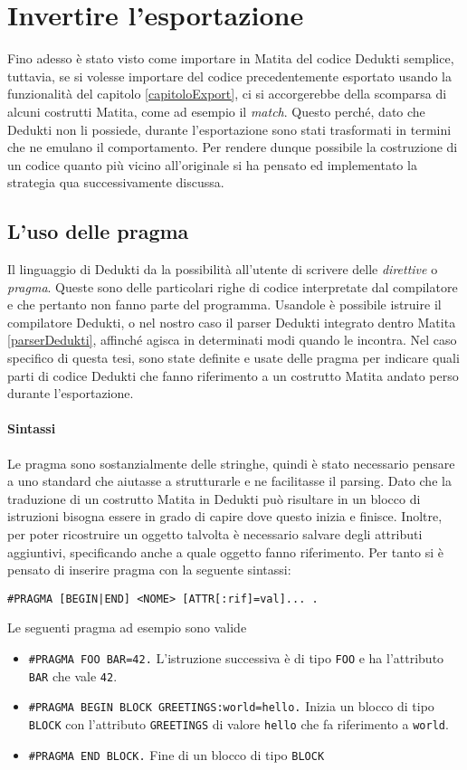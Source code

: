 \documentclass[12pt,a4paper]{report}
\begin{document}
\section{Invertire l'esportazione}
Fino adesso è stato visto come importare in Matita del codice Dedukti semplice,
tuttavia, se si volesse importare del codice precedentemente esportato usando
la funzionalità del capitolo \ref{capitoloExport}, ci si accorgerebbe della 
scomparsa di alcuni costrutti Matita, come ad esempio il \textit{match}. Questo
perché, dato che Dedukti non li possiede, durante l'esportazione sono stati
trasformati in termini che ne emulano il comportamento. Per rendere dunque possibile
la costruzione di un codice quanto più vicino all'originale si ha pensato ed 
implementato la strategia qua successivamente discussa.

\subsection{L'uso delle pragma}
Il linguaggio di Dedukti da la possibilità all'utente di scrivere delle 
\textit{direttive} o \textit{pragma}. Queste sono delle particolari righe di
codice interpretate dal compilatore e che pertanto non fanno parte del programma.
Usandole è possibile istruire il compilatore Dedukti, o nel nostro caso il parser
Dedukti integrato dentro Matita \ref{parserDedukti}, affinché agisca in determinati
modi quando le incontra. 
Nel caso specifico di questa tesi, sono state definite e usate delle pragma
per indicare quali parti di codice Dedukti che fanno riferimento a un costrutto 
Matita andato perso durante l'esportazione.

\paragraph{Sintassi} Le pragma sono sostanzialmente delle stringhe, quindi
è stato necessario pensare a uno standard che aiutasse a strutturarle e 
ne facilitasse il parsing. Dato che la traduzione di un costrutto Matita in 
Dedukti può risultare in un blocco di istruzioni bisogna essere in grado di
capire dove questo inizia e finisce. Inoltre, per poter ricostruire un oggetto
talvolta è necessario salvare degli attributi aggiuntivi, specificando anche
a quale oggetto fanno riferimento. Per tanto si è pensato di inserire pragma
con la seguente sintassi:

\begin{center}
  \texttt{\#PRAGMA [BEGIN|END] <NOME> [ATTR[:rif]=val]... .}
\end{center}
Le seguenti pragma ad esempio sono valide
\begin{itemize}
  \item  \texttt{\#PRAGMA FOO BAR=42.} L'istruzione successiva è di tipo
\texttt{FOO} e ha l'attributo \texttt{BAR} che vale \texttt{42}.
  \item  \texttt{\#PRAGMA BEGIN BLOCK GREETINGS:world=hello.} Inizia un blocco di
    tipo \texttt{BLOCK} con l'attributo \texttt{GREETINGS} di valore \texttt{hello}
    che fa riferimento a \texttt{world}.
  \item  \texttt{\#PRAGMA END BLOCK.} Fine di un blocco di tipo \texttt{BLOCK}
\end{itemize}
\end{document}
